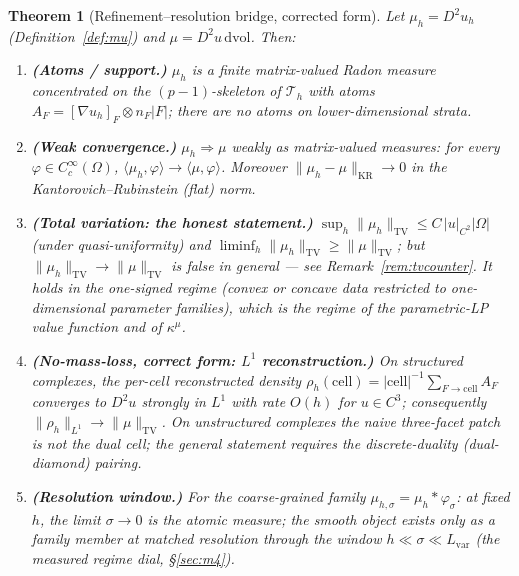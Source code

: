 \documentclass[11pt,a4paper]{article}
\theoremstyle{plain}
\newtheorem{theorem}{Theorem}[section]
\theoremstyle{definition}
\theoremstyle{remark}
\newcommand{\kmu}{\kappa^{\mu}}
\newcommand{\TV}{\mathrm{TV}}
\newcommand{\dvol}{\,\mathrm{dvol}}
\DeclareMathOperator{\KR}{KR}
\begin{document}
\begin{theorem}[Refinement--resolution bridge, corrected form]
\label{thm:Bprime}
Let $\mu_h = D^2 u_h$ (Definition~\ref{def:mu}) and
$\mu = D^2u \dvol$. Then:
\begin{enumerate}[label=(\roman*),leftmargin=2em]
\item \textbf{(Atoms / support.)} $\mu_h$ is a finite matrix-valued Radon
      measure concentrated on the $(p-1)$-skeleton of $\mathcal{T}_h$ with
      atoms $A_F = [\nabla u_h]_F \otimes n_F |F|$; there are no atoms on
      lower-dimensional strata.
\item \textbf{(Weak convergence.)} $\mu_h \Rightarrow \mu$ weakly as
      matrix-valued measures: for every
      $\varphi \in C_c^\infty(\Omega)$,
      $\langle \mu_h, \varphi \rangle \to \langle \mu, \varphi \rangle$.
      Moreover $\|\mu_h - \mu\|_{\KR} \to 0$ in the
      Kantorovich--Rubinstein (flat) norm.
\item \textbf{(Total variation: the honest statement.)}
      $\sup_h \|\mu_h\|_{\TV} \le C\,|u|_{C^2}|\Omega|$ (under
      quasi-uniformity) and
      $\liminf_h \|\mu_h\|_{\TV} \ge \|\mu\|_{\TV}$; but
      $\|\mu_h\|_{\TV} \to \|\mu\|_{\TV}$ is \emph{false in general} ---
      see Remark~\ref{rem:tvcounter}. It holds in the one-signed regime
      (convex or concave data restricted to one-dimensional parameter
      families), which is the regime of the parametric-LP value function
      and of $\kmu$.
\item \textbf{(No-mass-loss, correct form: $L^1$ reconstruction.)}
      On structured complexes, the per-cell reconstructed density
      $\rho_h(\mathrm{cell}) = |\mathrm{cell}|^{-1} \sum_{F \to
      \mathrm{cell}} A_F$ converges to $D^2 u$ \emph{strongly in $L^1$}
      with rate $O(h)$ for $u \in C^3$; consequently
      $\|\rho_h\|_{L^1} \to \|\mu\|_{\TV}$. On unstructured complexes the
      naive three-facet patch is not the dual cell; the general statement
      requires the discrete-duality (dual-diamond) pairing.
\item \textbf{(Resolution window.)} For the coarse-grained family
      $\mu_{h,\sigma} = \mu_h * \varphi_\sigma$: at fixed $h$, the limit
      $\sigma \to 0$ is the \emph{atomic} measure; the smooth object
      exists only as a family member at matched resolution through the
      window $h \ll \sigma \ll L_{\mathrm{var}}$ (the measured regime dial,
      \S\ref{sec:m4}).
\end{enumerate}
\end{theorem}
\end{document}
